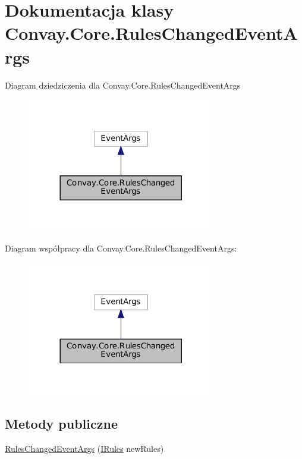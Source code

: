 \hypertarget{class_convay_1_1_core_1_1_rules_changed_event_args}{}\section{Dokumentacja klasy Convay.\+Core.\+Rules\+Changed\+Event\+Args}
\label{class_convay_1_1_core_1_1_rules_changed_event_args}


Diagram dziedziczenia dla Convay.\+Core.\+Rules\+Changed\+Event\+Args
\nopagebreak
\begin{figure}[H]
\begin{center}
\leavevmode
\includegraphics[width=233pt]{class_convay_1_1_core_1_1_rules_changed_event_args__inherit__graph}
\end{center}
\end{figure}


Diagram współpracy dla Convay.\+Core.\+Rules\+Changed\+Event\+Args\+:
\nopagebreak
\begin{figure}[H]
\begin{center}
\leavevmode
\includegraphics[width=233pt]{class_convay_1_1_core_1_1_rules_changed_event_args__coll__graph}
\end{center}
\end{figure}
\subsection*{Metody publiczne}
\begin{DoxyCompactItemize}
\item 
\hyperlink{class_convay_1_1_core_1_1_rules_changed_event_args_a196dba0faa4e265ee93ad9ac498e4ad3}{Rules\+Changed\+Event\+Args} (\hyperlink{interface_convay_1_1_core_1_1_interfaces_1_1_i_rules}{I\+Rules} new\+Rules)
\end{DoxyCompactItemize}
